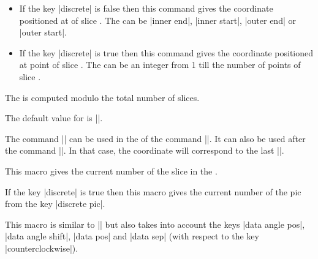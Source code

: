 \documentclass[a4paper,english,dvipsnames]{ltxdoc}
\begin{document}
\begin{command}{\WCcoordinate{}}
\begin{itemize}
\item If the key |discrete| is false then this command gives the coordinate positioned at  of slice . The  can be |inner end|, |inner start|, |outer end| or |outer start|.
\item If the key |discrete| is true then this command gives the coordinate positioned at point  of slice . The  can be an integer from 1 till the number of points of slice .
\end{itemize}
The  is computed modulo the total number of slices.

The default value for  is |\WCcount|.

The command |\WCcoordinate| can be used in the  of the command |\wheelchart|. It can also be used after the command |\wheelchart|. In that case, the coordinate will correspond to the last |\wheelchart|.
\end{command}
\begin{command}{\WCcount}
This macro gives the current number of the slice in the .
\end{command}
\begin{command}{\WCcountdiscrete}
If the key |discrete| is true then this macro gives the current number of the \tikzname{} pic from the key |discrete pic|.
\end{command}
\begin{command}{\WCdataangle}
This macro is similar to |\WCmidangle| but also takes into account the keys |data angle pos|, |data angle shift|, |data pos| and |data sep| (with respect to the key |counterclockwise|).
\end{command}
\begin{command}{\WCetocthelinkedname}
\end{command}
\begin{command}{\WCetocthelinkednumber}
\end{command}
\begin{command}{\WCetocthelinkedpage}
\end{command}
\begin{command}{\WCetocthename}
\end{command}
\begin{command}{\WCetocthenumber}
\end{command}
\end{document}
